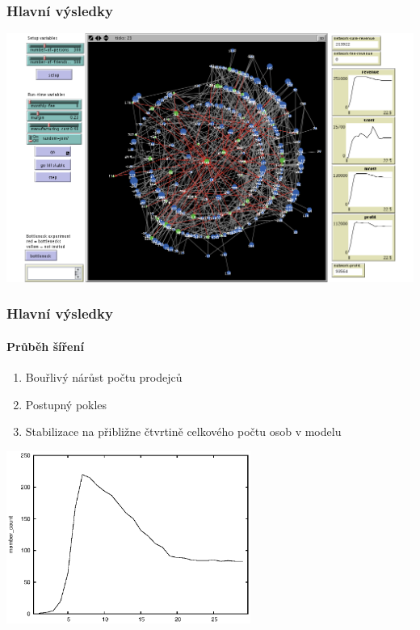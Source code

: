 \documentclass[xcolor=dvipsnames]{beamer}
\begin{document}
  \begin{frame}
    \frametitle{Hlavní výsledky}
    \hspace{-0.8cm}
    \includegraphics[width=1.0\paperwidth]{screen1.png}
  \end{frame}
  \begin{frame}
    \frametitle{Hlavní výsledky}
    \framesubtitle{Průběh šíření}
    \begin{enumerate}
      \item Bouřlivý nárůst počtu prodejců
      \item Postupný pokles
      \item Stabilizace na přibližne čtvrtině celkového počtu osob v modelu
    \end{enumerate}
    \begin{center}\includegraphics[width=0.6\textwidth]{member_count.eps}\end{center}
  \end{frame}
\end{document}
